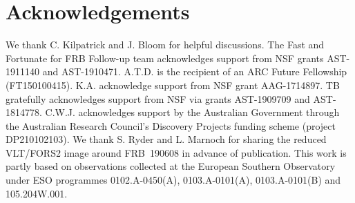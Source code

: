 \documentclass[twocolumn,linenumbers]{aastex63}
\newcommand{\mpoffset}{p(\omega|O_i)}  %
\newcommand{\poffset}{$\mpoffset$}
\begin{document}

\section*{Acknowledgements}
We thank C. Kilpatrick and J. Bloom for helpful
discussions.
The Fast and Fortunate for FRB
Follow-up team acknowledges support from 
NSF grants AST-1911140 and AST-1910471. 
A.T.D. is the recipient of an ARC Future Fellowship (FT150100415). K.A. acknowledge support from NSF grant AAG-1714897.
TB gratefully acknowledges support from NSF via grants AST-1909709 and AST-1814778.
C.W.J. acknowledges support by the Australian Government through the Australian Research Council's Discovery Projects funding scheme (project DP210102103).
We thank S. Ryder and L. Marnoch for sharing the reduced
VLT/FORS2 image around FRB~190608 in advance of publication.
This work is partly based on observations collected at the European
Southern Observatory 
under ESO programmes 0102.A-0450(A), 0103.A-0101(A), 0103.A-0101(B) and 105.204W.001.




%
%

\end{document}
